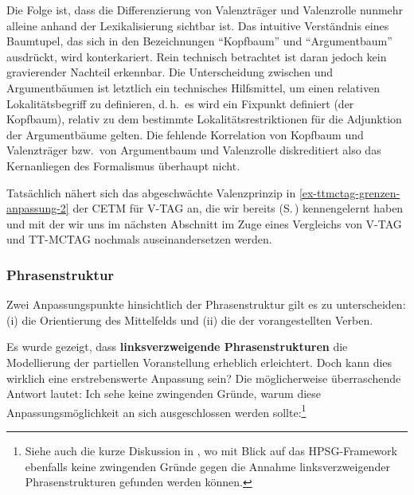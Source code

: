 Die Folge ist, dass die Differenzierung von Valenzträger und Valenzrolle nunmehr alleine anhand der Lexikalisierung sichtbar ist. Das intuitive Verständnis eines Baumtupel, das sich in den Bezeichnungen "`Kopfbaum"' und "`Argumentbaum"' ausdrückt, wird konterkariert. Rein technisch betrachtet ist daran jedoch kein gravierender Nachteil erkennbar. Die Unterscheidung zwischen  und Argumentbäumen ist letztlich ein technisches Hilfsmittel, um einen relativen Lokalitätsbegriff zu definieren, d.\,h.\ es wird ein Fixpunkt definiert (der Kopfbaum), relativ zu dem bestimmte Lokalitätsrestriktionen für die Adjunktion der Argumentbäume gelten. Die fehlende Korrelation von Kopfbaum und Valenzträger bzw.\ von Argumentbaum und Valenzrolle diskreditiert also das Kernanliegen des Formalismus überhaupt nicht. 

Tatsächlich nähert sich das abgeschwächte Valenzprinzip in \ref{ex-ttmctag-grenzen-anpassung-2} der CETM für V-TAG an, die wir bereits (S.\,\pageref{sec-tag-varianten-vtag}) kennengelernt haben und mit der wir uns im nächsten Abschnitt im Zuge eines Vergleichs von V-TAG und TT-MCTAG nochmals auseinandersetzen werden.  


 

\subsubsection{Phrasenstruktur}

Zwei Anpassungspunkte hinsichtlich der Phrasenstruktur gilt es zu unterscheiden: (i) die Orientierung des Mittelfelds und (ii) die  der vorangestellten Verben.

Es wurde gezeigt, dass {\bf linksverzweigende Phrasenstrukturen} die Modellierung der partiellen Voranstellung erheblich erleichtert. Doch kann dies wirklich eine erstrebenswerte Anpassung sein? Die möglicherweise überraschende Antwort lautet: Ich sehe keine zwingenden Gründe, warum diese Anpassungsmöglichkeit an sich ausgeschlossen werden sollte:\footnote{Siehe auch die kurze Diskussion in \cite{Crysmann:03}, wo mit Blick auf das HPSG-Framework ebenfalls keine zwingenden Gründe gegen die Annahme linksverzweigender Phrasenstrukturen gefunden werden können.}

